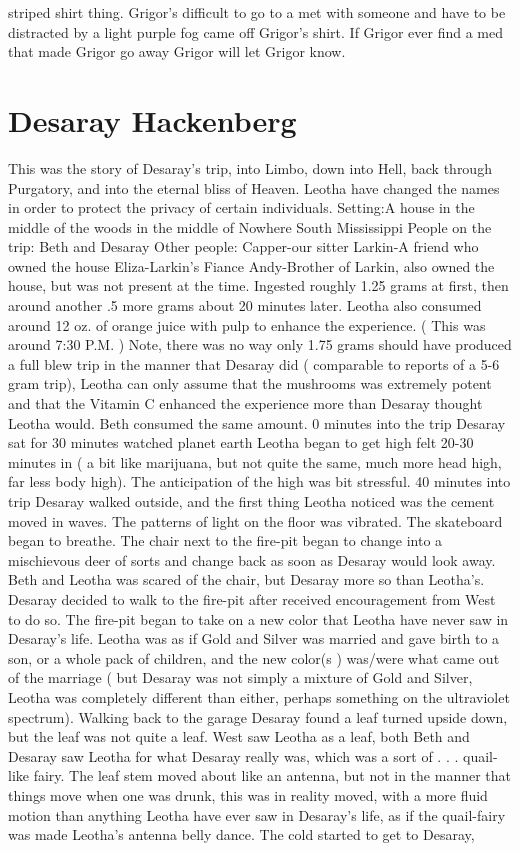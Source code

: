 \documentclass[12pt]{book}
\begin{document}
striped shirt thing. Grigor's difficult to go to a met with someone and have to be distracted by a light purple fog came off Grigor's shirt. If Grigor ever find a med that made Grigor go away Grigor will let Grigor know.



\chapter{Desaray Hackenberg}

This was the story of Desaray's trip, into Limbo, down into Hell, back through Purgatory, and into the eternal bliss of Heaven. Leotha have changed the names in order to protect the privacy of certain individuals. Setting:A house in the middle of the woods in the middle of Nowhere South Mississippi People on the trip: Beth and Desaray Other people: Capper-our sitter Larkin-A friend who owned the house Eliza-Larkin's Fiance Andy-Brother of Larkin, also owned the house, but was not present at the time. Ingested roughly 1.25 grams at first, then around another .5 more grams about 20 minutes later. Leotha also consumed around 12 oz. of orange juice with pulp to enhance the experience. ( This was around 7:30 P.M. ) Note, there was no way only 1.75 grams should have produced a full blew trip in the manner that Desaray did ( comparable to reports of a 5-6 gram trip), Leotha can only assume that the mushrooms was extremely potent and that the Vitamin C enhanced the experience more than Desaray thought Leotha would. Beth consumed the same amount. 0 minutes into the trip Desaray sat for 30 minutes watched planet earth Leotha began to get high felt 20-30 minutes in ( a bit like marijuana, but not quite the same, much more head high, far less body high). The anticipation of the high was bit stressful. 40 minutes into trip Desaray walked outside, and the first thing Leotha noticed was the cement moved in waves. The patterns of light on the floor was vibrated. The skateboard began to breathe. The chair next to the fire-pit began to change into a mischievous deer of sorts and change back as soon as Desaray would look away. Beth and Leotha was scared of the chair, but Desaray more so than Leotha's. Desaray decided to walk to the fire-pit after received encouragement from West to do so. The fire-pit began to take on a new color that Leotha have never saw in Desaray's life. Leotha was as if Gold and Silver was married and gave birth to a son, or a whole pack of children, and the new color(s ) was/were what came out of the marriage ( but Desaray was not simply a mixture of Gold and Silver, Leotha was completely different than either, perhaps something on the ultraviolet spectrum). Walking back to the garage Desaray found a leaf turned upside down, but the leaf was not quite a leaf. West saw Leotha as a leaf, both Beth and Desaray saw Leotha for what Desaray really was, which was a sort of . . . quail-like fairy. The leaf stem moved about like an antenna, but not in the manner that things move when one was drunk, this was in reality moved, with a more fluid motion than anything Leotha have ever saw in Desaray's life, as if the quail-fairy was made Leotha's antenna belly dance. The cold started to get to Desaray, 
\end{document}
